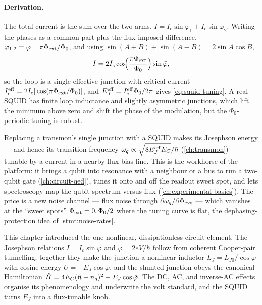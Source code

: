 \paragraph{Derivation.}
The total current is the sum over the two arms,
$I=I_c\sin\varphi_1+I_c\sin\varphi_2$. Writing the phases as a common
part plus the flux-imposed difference,
$\varphi_{1,2}=\bar\varphi\pm\pi\Phi_{\rm ext}/\Phi_0$, and using
$\sin(A+B)+\sin(A-B)=2\sin A\cos B$,
\begin{equation}
I = 2I_c\cos\!\Bigl(\frac{\pi\Phi_{\rm ext}}{\Phi_0}\Bigr)\sin\bar\varphi,
\end{equation}
so the loop is a single effective junction with critical current
$I_c^{\rm eff}=2I_c|\cos(\pi\Phi_{\rm ext}/\Phi_0)|$, and
$E_J^{\rm eff}=I_c^{\rm eff}\Phi_0/2\pi$ gives \cref{eq:squid-tuning}.
A real SQUID has finite loop inductance and slightly asymmetric
junctions, which lift the minimum above zero and shift the phase of the
modulation, but the $\Phi_0$-periodic tuning is robust.

\begin{application}
\label{app:squid-knob}
Replacing a transmon's single junction with a SQUID makes its
Josephson energy --- and hence its transition frequency
$\omega_q\propto\sqrt{8E_J^{\rm eff}E_C}/\hbar$ (\cref{ch:transmon})
--- tunable by a current in a nearby flux-bias line. This is the
workhorse of the platform: it brings a qubit into resonance with a
neighbour or a bus to run a two-qubit gate (\cref{ch:circuit-qed}),
tunes it onto and off the readout sweet spot, and lets spectroscopy map
the qubit spectrum versus flux (\cref{ch:experimental-basics}). The
price is a new noise channel --- flux noise through
$\partial\omega_q/\partial\Phi_{\rm ext}$ --- which vanishes at the
``sweet spots'' $\Phi_{\rm ext}=0,\Phi_0/2$ where the tuning curve is
flat, the dephasing-protection idea of \cref{stmt:noise-rates}.
\end{application}

This chapter introduced the one nonlinear, dissipationless circuit
element. The Josephson relations $I=I_c\sin\varphi$ and
$\dot\varphi=2eV/\hbar$ follow from coherent Cooper-pair tunnelling;
together they make the junction a nonlinear inductor
$L_J=L_{J0}/\cos\varphi$ with cosine energy $U=-E_J\cos\varphi$, and the
shunted junction obeys the canonical Hamiltonian
$\hat{H}=4E_C(\hat{n}-n_g)^2-E_J\cos\hat{\varphi}$. The DC, AC, and inverse-AC
effects organise its phenomenology and underwrite the volt standard,
and the SQUID turns $E_J$ into a flux-tunable knob.

